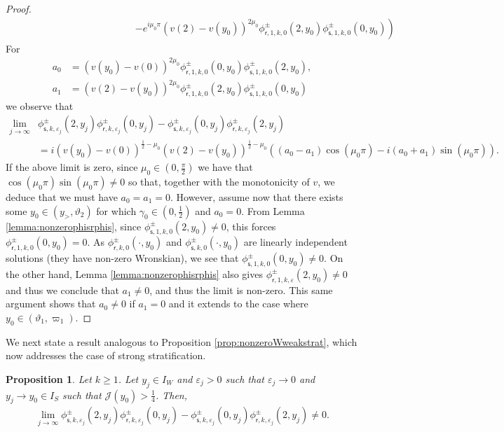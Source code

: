 \documentclass[11pt,reqno]{amsproc}
\newtheorem{proposition}{Proposition}[section]
\theoremstyle{definition}
\numberwithin{equation}{section}
\newcommand{\cJ}{{\mathcal{J}}}
\newcommand{\sr}{{\mathsf{r}}}
\newcommand{\s}{{\mathsf{s}}}
\newcommand{\ep}{\varepsilon}
\begin{document}
\begin{proof}
\begin{align*}
&\qquad\qquad\qquad\qquad\qquad\qquad \left.- e^{i\mu_0\pi}(v(2)-v(y_0))^{2\mu_0}\phi_{\sr,1,k,0}^\pm(2,y_0){\phi_{\s,1,k,0}^\pm(0,y_0)} \right)
\end{align*}
For
\begin{align*}
a_0 &= (v(y_0)-v(0))^{2\mu_0}\phi_{\sr,1,k,0}^\pm(0,y_0){\phi_{\s,1,k,0}^\pm(2,y_0)}, \\ 
a_1 &= (v(2)-v(y_0))^{2\mu_0}\phi_{\sr,1,k,0}^\pm(2,y_0){\phi_{\s,1,k,0}^\pm(0,y_0)}
\end{align*}
we observe that 
\begin{align*}
\lim_{j\rightarrow \infty} &\phi_{\s,k,\ep_j}^\pm(2,y_j)\phi_{\sr,k,\ep_j}^\pm(0,y_j) - \phi_{\s,k,\ep_j}^\pm(0,y_j)\phi_{\sr,k,\ep_j}^\pm(2,y_j) \\
&=i(v(y_0)-v(0))^{\frac12-\mu_0}(v(2)-v(y_0))^{\frac12-\mu_0} \left( (a_0-a_1)\cos(\mu_0\pi) - i (a_0+a_1)\sin(\mu_0\pi) \right).
\end{align*}
If the above limit is zero, since $\mu_0\in (0,\frac{\pi}{2})$ we have that $\cos(\mu_0\pi)\sin(\mu_0\pi)\neq 0$ so that, together with the monotonicity of $v$, we deduce that we must have $a_0=a_1=0$. However, assume now that there exists some $y_0\in \left(y_>, \vartheta_2\right)$ for which $\gamma_0\in \left(0,\frac12\right)$ and $a_0=0$. From Lemma \ref{lemma:nonzerophisrphis},  since $\phi_{\s,1,k,0}^\pm(2,y_0)\neq 0$, this forces $\phi_{\sr,1,k,0}^\pm(0,y_0) = 0$. As $\phi_{\sr,k,0}^\pm(\cdot,y_0)$ and $\phi_{\s,k,0}^\pm(\cdot,y_0)$ are linearly independent solutions (they have non-zero Wronskian), we see that $\phi_{\s,1,k,0}^\pm(0,y_0)\neq 0$. On the other hand, Lemma \ref{lemma:nonzerophisrphis} also gives $\phi_{\sr,1,k,\ep}^\pm(2,y_0)\neq 0$ and thus we conclude that $a_1\neq 0$, and thus the limit is non-zero. This same argument shows that $a_0\neq 0$ if $a_1 = 0$ and it extends to the case where $y_0\in (\vartheta_1, \varpi_1)$.
\end{proof}

We next state a result analogous to Proposition \ref{prop:nonzeroWweakstrat}, which now addresses the case of strong stratification.

\begin{proposition}\label{prop:nonzeroWstrongstrat}
Let $k\geq 1$. Let $y_j\in I_W$ and $\ep_j>0$ such that $\ep_j\rightarrow 0$ and $y_j\rightarrow y_0\in I_S$ such that $\cJ(y_0)> \frac14$. Then,
\begin{align*}
\lim_{j\rightarrow \infty} \phi_{\s,k,\ep_j}^\pm(2,y_j)\phi_{\sr,k,\ep_j}^\pm(0,y_j) - \phi_{\s,k,\ep_j}^\pm(0,y_j)\phi_{\sr,k,\ep_j}^\pm(2,y_j) \neq 0.
\end{align*}
\end{proposition}
\end{document}
